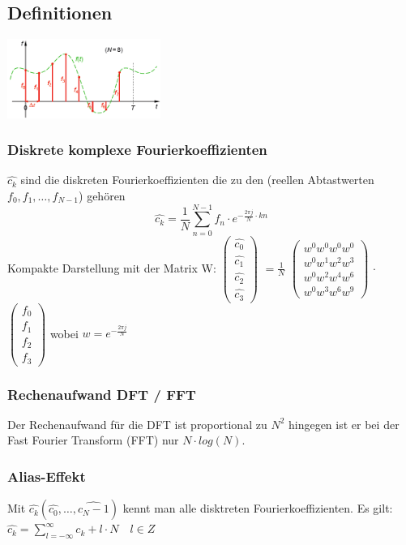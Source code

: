 \subsection{Definitionen}
\includegraphics[width=5cm]{./bilder/abtastung.png}

\subsubsection{Diskrete komplexe Fourierkoeffizienten}
$\hat{c_k}$ sind die diskreten Fourierkoeffizienten die zu den (reellen
Abtastwerten $f_0, f_1,\ldots,f_{N-1}$) gehören\\
$$\hat{c_k}=\frac{1}{N}\sum\limits_{n=0}^{N-1}f_n\cdot e^{-\frac{2\pi j}{N}\cdot
kn}$$
Kompakte Darstellung mit der Matrix W:
$\begin{pmatrix}
 \hat{c_0}\\\hat{c_1}\\\hat{c_2}\\\hat{c_3}
\end{pmatrix}$
$=\frac{1}{N}$
$\begin{pmatrix}
 w^0w^0w^0w^0\\w^0w^1w^2w^3\\w^0w^2w^4w^6\\w^0w^3w^6w^9
\end{pmatrix}$
$\cdot$
$\begin{pmatrix}
 f_0\\f_1\\f_2\\f_3
\end{pmatrix}$
wobei $w=e^{-\frac{2\pi j}{N}}$

\subsubsection{Rechenaufwand DFT / FFT}
Der Rechenaufwand für die DFT ist proportional zu $N^2$ 
hingegen ist er bei der Fast Fourier Transform (FFT) nur $N\cdot log(N)$.

\subsubsection{Alias-Effekt}
Mit $\hat{c_k}(\hat{c_0},\ldots,\hat{c_N-1})$ kennt man alle disktreten Fourierkoeffizienten. Es gilt:
$\hat{c_k}=\sum\limits_{l=-\infty}^{\infty}c_k+l\cdot N \quad l\in Z$

